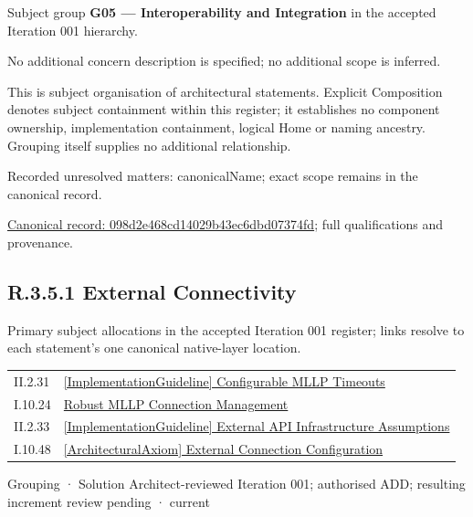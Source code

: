 Subject group \textbf{G05 — Interoperability and Integration} in the accepted Iteration 001 hierarchy.



No additional concern description is specified; no additional scope is inferred.



This is subject organisation of architectural statements. Explicit Composition denotes subject containment within this register; it establishes no component ownership, implementation containment, logical Home or naming ancestry. Grouping itself supplies no additional relationship.


{\small Recorded unresolved matters: canonicalName; exact scope remains in the canonical record.}\par
{\footnotesize \href{../../../../continuum/grouping/098d2e468cd14029b43ec6dbd07374fd.md}{Canonical record: 098d2e468cd14029b43ec6dbd07374fd}; full qualifications and provenance.}\par
\subsection*{R.3.5.1 External Connectivity}
\label{navigation:R.3.5.1}

Primary subject allocations in the accepted Iteration 001 register; links resolve to each statement’s one canonical native-layer location.\par
\begin{longtable}{p{.22\linewidth}p{.73\linewidth}}
II.2.31 & \hyperref[element:267142b7a01a49c686458b9fc1c8d7b2]{[ImplementationGuideline] Configurable MLLP Timeouts} \\
I.10.24 & \hyperref[element:e7b7d94a94194ef28a12051a550d3f3f]{Robust MLLP Connection Management} \\
II.2.33 & \hyperref[element:a0c7aa62c0ff498c91dcd6af011170ce]{[ImplementationGuideline] External API Infrastructure Assumptions} \\
I.10.48 & \hyperref[element:f24e63c49135411bbfbc06f9385aeea5]{[ArchitecturalAxiom] External Connection Configuration} \\
\end{longtable}
\label{element:0b9e18356e9e4dcca51007f03f7b81b4}
{\small Grouping · Solution Architect-reviewed Iteration 001; authorised ADD; resulting increment review pending · current}\par

